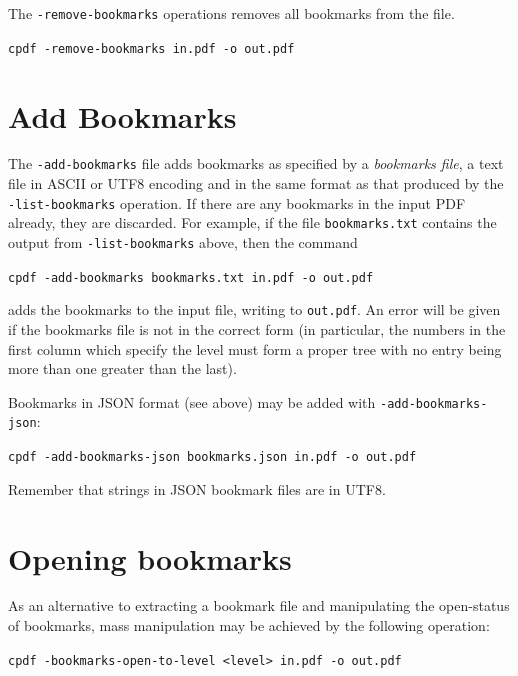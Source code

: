 \documentclass{book}
\begin{document}
  The \texttt{-remove-bookmarks} operations removes all bookmarks from the file.

  \begin{framed}
    \noindent\small\verb!cpdf -remove-bookmarks in.pdf -o out.pdf!
  \end{framed}

  \section{Add Bookmarks}
  
  The \texttt{-add-bookmarks} file adds bookmarks as specified by a
\textit{bookmarks file}, a text file in ASCII or UTF8 encoding and in the same format as that produced by the
\texttt{-list-bookmarks} operation. If there are any bookmarks in the input PDF
already, they are discarded. For example, if the file \texttt{bookmarks.txt}
contains the output from \texttt{-list-bookmarks} above, then the command

  \begin{framed}
   \noindent\small\verb!cpdf -add-bookmarks bookmarks.txt in.pdf -o out.pdf!
  \end{framed}

\noindent adds the bookmarks to the input file, writing to \texttt{out.pdf}. An error
will be given if the bookmarks file is not in the correct form (in particular,
the numbers in the first column which specify the level must form a proper
tree with no entry being more than one greater than the last).

Bookmarks in JSON format (see above) may be added with \texttt{-add-bookmarks-json}:

  \begin{framed}
   \noindent\small\verb!cpdf -add-bookmarks-json bookmarks.json in.pdf -o out.pdf!
  \end{framed}

\noindent Remember that strings in JSON bookmark files are in UTF8.

\section{Opening bookmarks}
As an alternative to extracting a bookmark file and manipulating the open-status of bookmarks, mass manipulation may be achieved by the following operation:

  \begin{framed}
   \noindent\small\verb!cpdf -bookmarks-open-to-level <level> in.pdf -o out.pdf!
  \end{framed}
\end{document}
